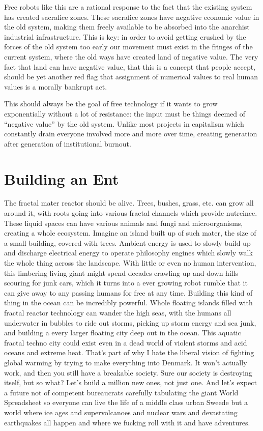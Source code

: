 Free robots like this are a rational response to the fact that the
existing system has created sacrafice zones. These sacrafice zones have
negative economic value in the old system, making them freely available
to be absorbed into the anarchist industrial infrastructure. This is
key: in order to avoid getting crushed by the forces of the old system
too early our movement must exist in the fringes of the current system,
where the old ways have created land of negative value. The very fact
that land can have negative value, that this is a concept that people
accept, should be yet another red flag that assignment of numerical
values to real human values is a morally bankrupt act.

This should always be the goal of free technology if it wants to grow
exponentially without a lot of resistance: the input must be things
deemed of ``negative value'' by the old system. Unlike most projects in
capitalism which constantly drain everyone involved more and more over
time, creating generation after generation of institutional burnout.

\section{Building an Ent}\label{building-an-ent}

The fractal mater reactor should be alive. Trees, bushes, grass, etc.
can grow all around it, with roots going into various fractal channels
which provide nutreince. These liquid spaces can have various animals
and fungi and microorganisms, creating a whole ecosystem. Imagine an
island built up of such mater, the size of a small building, covered
with trees. Ambient energy is used to slowly build up and discharge
electrical energy to operate philosophy engines which slowly walk the
whole thing across the landscape. With little or even no human
intervention, this limbering living giant might spend decades crawling
up and down hills scouring for junk cars, which it turns into a ever
growing robot rumble that it can give away to any passing humans for
free at any time. Building this kind of thing in the ocean can be
incredibly powerful. Whole floating islands filled with fractal reactor
technology can wander the high seas, with the humans all underwater in
bubbles to ride out storms, picking up storm energy and sea junk, and
building a every larger floating city deep out in the ocean. This
aquatic fractal techno city could exist even in a dead world of violent
storms and acid oceans and extreme heat. That's part of why I hate the
liberal vision of fighting global warming by trying to make everything
into Denmark. It won't actually work, and then you still have a
breakable society. Sure our society is destroying itself, but so what?
Let's build a million new ones, not just one. And let's expect a future
not of competent bureaucrats carefully tabulating the giant World
Spreadsheet so everyone can live the life of a middle class urban Sweede
but a world where ice ages and supervolcanoes and nuclear wars and
devastating earthquakes all happen and where we fucking roll with it and
have adventures.

